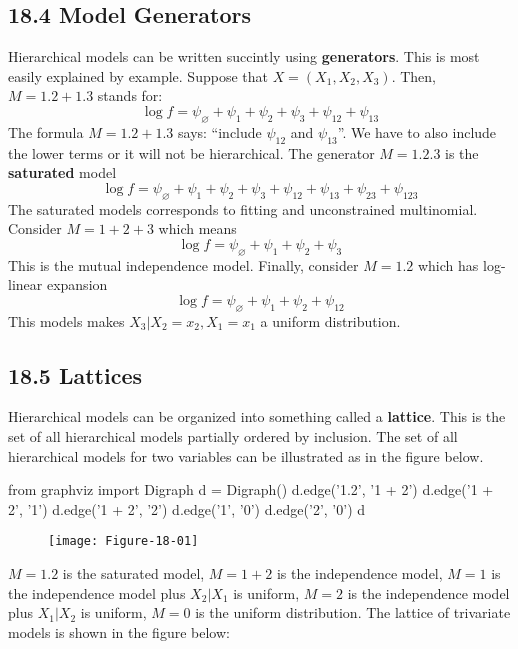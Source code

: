 \subsection*{18.4 Model Generators}\label{model-generators}
Hierarchical models can be written succintly using \textbf{generators}.
This is most easily explained by example. Suppose that
\(X = (X_{1}, X_{2}, X_{3})\). Then, \(M = 1.2 + 1.3\) stands for:
\[
\log f = \psi_\varnothing + \psi_{1} + \psi_{2} + \psi_{3} + \psi_{12} + \psi_{13}
\]
The formula \(M = 1.2 + 1.3\) says: ``include \(\psi_{12}\) and
\(\psi_{13}\)''. We have to also include the lower terms or it will not be
hierarchical. The generator \(M = 1.2.3\) is the \textbf{saturated}
model
\[
\log f = \psi_\varnothing + \psi_{1} + \psi_{2} + \psi_{3} + \psi_{12} + \psi_{13} + \psi_{23} + \psi_{123}
\]
The saturated models corresponds to fitting and unconstrained
multinomial. Consider \(M = 1 + 2 + 3\) which means
\[
\log f = \psi_\varnothing + \psi_{1} + \psi_{2} + \psi_{3}
\]
This is the mutual independence model. Finally, consider \(M = 1.2\)
which has log-linear expansion
\[
\log f = \psi_\varnothing + \psi_{1} + \psi_{2} + \psi_{12}
\]
This models makes \(X_{3} | X_{2} = x_{2}, X_{1} = x_{1}\) a uniform distribution.

\subsection*{18.5 Lattices}\label{lattices}
Hierarchical models can be organized into something called a
\textbf{lattice}. This is the set of all hierarchical models partially
ordered by inclusion. The set of all hierarchical models for two
variables can be illustrated as in the figure below.

\begin{python}
from graphviz import Digraph
d = Digraph()
d.edge('1.2', '1 + 2')
d.edge('1 + 2', '1')
d.edge('1 + 2', '2')
d.edge('1', '0')
d.edge('2', '0')
d
\end{python}

\begin{figure}[H]
\centering
\texttt{[image: Figure-18-01]}
\end{figure}

\(M = 1.2\) is the saturated model, \(M = 1 + 2\) is the independence
model, \(M = 1\) is the independence model plus \(X_{2} | X_{1}\) is
uniform, \(M = 2\) is the independence model plus \(X_{1} | X_{2}\) is
uniform, \(M = 0\) is the uniform distribution.
The lattice of trivariate models is shown in the figure below:

